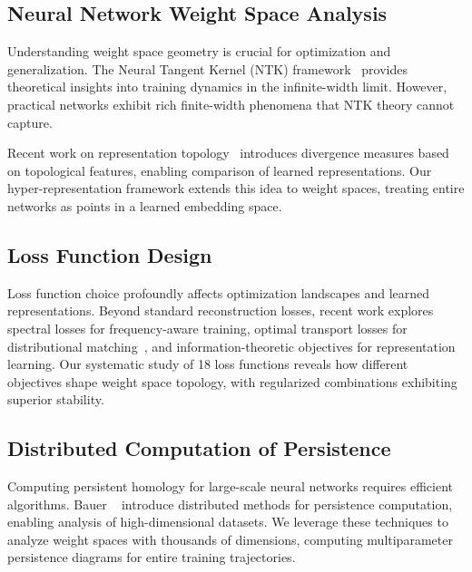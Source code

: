 \subsection{Neural Network Weight Space Analysis}

Understanding weight space geometry is crucial for optimization and generalization. The Neural Tangent Kernel (NTK) framework~\cite{adlamNeuralTangentKernel2020} provides theoretical insights into training dynamics in the infinite-width limit. However, practical networks exhibit rich finite-width phenomena that NTK theory cannot capture.

Recent work on representation topology~\cite{barannikovRepresentationTopologyDivergence2022} introduces divergence measures based on topological features, enabling comparison of learned representations. Our hyper-representation framework extends this idea to weight spaces, treating entire networks as points in a learned embedding space.

\subsection{Loss Function Design}

Loss function choice profoundly affects optimization landscapes and learned representations. Beyond standard reconstruction losses, recent work explores spectral losses for frequency-aware training, optimal transport losses for distributional matching~\cite{230909442UseKantorovichRubinstein2025}, and information-theoretic objectives for representation learning. Our systematic study of 18 loss functions reveals how different objectives shape weight space topology, with regularized combinations exhibiting superior stability.

\subsection{Distributed Computation of Persistence}

Computing persistent homology for large-scale neural networks requires efficient algorithms. Bauer \etal~\cite{bauerDistributedComputationPersistent2013} introduce distributed methods for persistence computation, enabling analysis of high-dimensional datasets. We leverage these techniques to analyze weight spaces with thousands of dimensions, computing multiparameter persistence diagrams for entire training trajectories.

